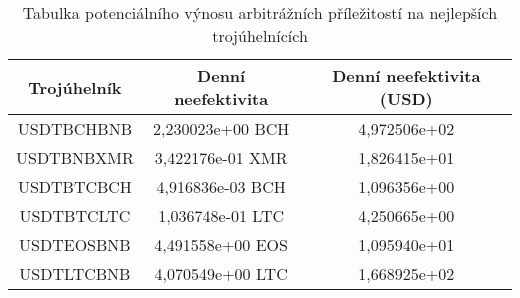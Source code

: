 \begin{table}\centering
\caption{Tabulka potenciálního výnosu arbitrážních příležitostí na nejlepších trojúhelnících}
\label{table_gains_best}
\begin{tabular}{|| c | c | c ||}\hline Trojúhelník & Denní neefektivita & Denní neefektivita (USD)\\ [0.5ex]
 \hline\hline USDTBCHBNB & 2,230023e+00 BCH & 4,972506e+02\\ 
 \hline USDTBNBXMR & 3,422176e-01 XMR & 1,826415e+01\\ 
 \hline USDTBTCBCH & 4,916836e-03 BCH & 1,096356e+00\\ 
 \hline USDTBTCLTC & 1,036748e-01 LTC & 4,250665e+00\\ 
 \hline USDTEOSBNB & 4,491558e+00 EOS & 1,095940e+01\\ 
 \hline USDTLTCBNB & 4,070549e+00 LTC & 1,668925e+02\\ 
 \hline
\end{tabular}
\end{table}